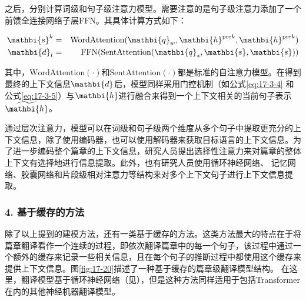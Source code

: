 \noindent 之后，分别计算词级和句子级注意力模型。需要注意的是句子级注意力添加了一个前馈全连接网络子层FFN。其具体计算方式如下：

\begin{eqnarray}
\mathbi{s}^k&=&\textrm{WordAttention}(\mathbi{q}_{w},\mathbi{h}^{\textrm {pre}k},\mathbi{h}^{\textrm{pre}k})
\label{eq:17-3-7}\\
\mathbi{d}_t&=&\textrm{FFN}(\textrm{SentAttention}(\mathbi{q}_{s},\mathbi{s},\mathbi{s}))
\label{eq:17-3-9}
\end{eqnarray}

\noindent 其中，$\textrm{WordAttention}(\cdot)$和$\textrm{SentAttention}(\cdot)$都是标准的自注意力模型。在得到最终的上下文信息$\mathbi{d}$后，模型同样采用门控机制（如公式\eqref{eq:17-3-4} 和公式\eqref{eq:17-3-5}）与$\mathbi{h}$进行融合来得到一个上下文相关的当前句子表示$\widetilde{\mathbi{h}}$。

\parinterval 通过层次注意力，模型可以在词级和句子级两个维度从多个句子中提取更充分的上下文信息，除了使用编码器，也可以使用解码器来获取目标语言的上下文信息。为了进一步编码整个篇章的上下文信息，研究人员提出选择性注意力来对篇章的整体上下文有选择地进行信息提取。此外，也有研究人员使用循环神经网络、 记忆网络、胶囊网络和片段级相对注意力等结构来对多个上下文句子进行上下文信息提取。


\subsubsection{4. 基于缓存的方法}

\parinterval 除了以上提到的建模方法，还有一类基于缓存的方法。这类方法最大的特点在于将篇章翻译看作一个连续的过程，即依次翻译篇章中的每一个句子，该过程中通过一个额外的缓存来记录一些相关信息，且在每个句子的推断过程中都使用这个缓存来提供上下文信息。图\ref{fig:17-20}描述了一种基于缓存的篇章级翻译模型结构。 在这里，翻译模型基于循环神经网络（见{\chapterten}），但是这种方法同样适用于包括Transformer在内的其他神经机器翻译模型。


